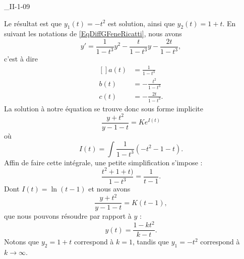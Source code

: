 \begin{corrige}{_II-1-09}
\begin{enumerate}
Le résultat est que $y_1(t)=-t^2$ est solution, ainsi que $y_2(t)=1+t$. En suivant les notations de \eqref{EqDiffGFeneRicatti}, nous avons
\begin{equation}
	y'=\frac{1}{ 1-t^3 }y^2-\frac{ t }{ 1-t^3 }y-\frac{ 2t }{ 1-t^3 },
\end{equation}
c'est à dire
\begin{equation}
	\begin{aligned}[]
		a(t)	&=\frac{1}{ 1-t^3 }\\
		b(t)	&=-\frac{ t^2 }{ 1-t^3 }\\
		c(t)	&=-\frac{ 2t }{ 1-t^3 }.
	\end{aligned}
\end{equation}
La solution à notre équation se trouve donc sous forme implicite
\begin{equation}
	\frac{ y+t^2 }{ y-1-t }=K e^{I(t)}
\end{equation}
où
\begin{equation}
	I(t)=\int\frac{1}{ 1-t^3 }(-t^2-1-t).
\end{equation}
Affin de faire cette intégrale, une petite simplification s'impose :
\begin{equation}
	\frac{t^2+1+t)}{ 1-t^3 }=\frac{1}{ t-1 }.
\end{equation}
Dont $I(t)=\ln(t-1)$ et nous avons
\begin{equation}
	\frac{ y+t^2 }{ y-1-t }=K(t-1),
\end{equation}
que nous pouvons résoudre par rapport à $y$ :
\begin{equation}
	y(t)=\frac{ 1-kt^2 }{ k-t }.
\end{equation}
Notons que $y_2=1+t$ correspond à $k=1$, tandis que $y_1=-t^2$ correspond à $k\to\infty$.

\end{enumerate}

\end{corrige}
